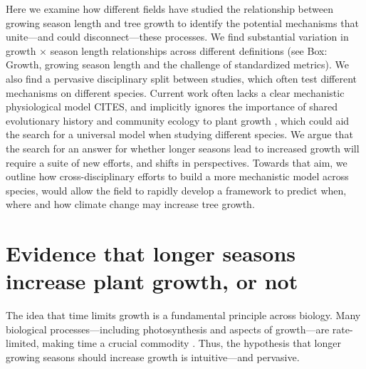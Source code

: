 \documentclass[11pt]{article}
\newcommand{\R}[1]{\label{#1}\linelabel{#1}}
\begin{document}
Here we examine how different fields have studied the relationship between growing season length and tree growth to identify the potential mechanisms that unite---and could disconnect---these processes. %
We find substantial variation in growth $\times$ season length relationships across different definitions (see Box: Growth, growing season length and the challenge of standardized metrics). We also find a pervasive disciplinary split between studies, which often test different mechanisms on different species. Current work often lacks a clear mechanistic physiological model CITES, and implicitly ignores the importance of shared evolutionary history and community ecology to plant growth \citep[e.g.][]{Grime:1977sw,Webb:2002or,avila2023evidence}, which could aid the search for a universal model when studying different species. We argue that the search for an answer for whether longer seasons lead to increased growth will require a suite of new efforts, and shifts in perspectives. Towards that aim, we outline how cross-disciplinary efforts to build a more mechanistic model across species, would allow the field to rapidly develop a framework to predict when, where and how climate change may increase tree growth. \R{forncc} %

\section*{Evidence that longer seasons increase plant growth, or not}
The idea that time limits growth is a fundamental principle across biology. Many biological processes---including photosynthesis and aspects of growth---are rate-limited, making time a crucial commodity \citep{nobel1983biophysical,cosgrove2005growth,hilty2021plant}. Thus, the hypothesis that longer growing seasons should increase growth is intuitive---and pervasive. 
\end{document}
